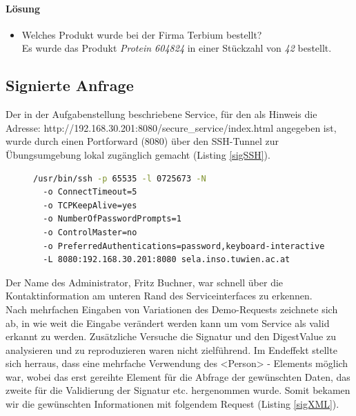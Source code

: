 \documentclass[12pt]{article}
\begin{document}
\paragraph{Lösung}
\begin{itemize}
	\item Welches Produkt wurde bei der Firma Terbium bestellt?\\
		Es wurde das Produkt \textit{Protein 604824} in einer Stückzahl von \textit{42} bestellt.
\end{itemize}

\subsection{Signierte Anfrage}
Der in der Aufgabenstellung beschriebene Service, für den als Hinweis die  Adresse: http://192.168.30.201:8080/secure\_service/index.html angegeben ist, wurde durch einen Portforward (8080) über den SSH-Tunnel zur Übungsumgebung lokal zugänglich gemacht (Listing \ref{sigSSH}).\\
\begin{figure}
\begin{lstlisting}[language=sh,caption={SSH Tunnel für Port forward},label=sigSSH,basicstyle=\footnotesize]
/usr/bin/ssh -p 65535 -l 0725673 -N 
  -o ConnectTimeout=5 
  -o TCPKeepAlive=yes 
  -o NumberOfPasswordPrompts=1 
  -o ControlMaster=no 
  -o PreferredAuthentications=password,keyboard-interactive 
  -L 8080:192.168.30.201:8080 sela.inso.tuwien.ac.at
\end{lstlisting}
\end{figure}
Der Name des Administrator, Fritz Buchner, war schnell über die Kontaktinformation am unteren Rand des Serviceinterfaces zu erkennen.\\
Nach mehrfachen Eingaben von Variationen des Demo-Requests zeichnete sich ab, in wie weit die Eingabe verändert werden kann um vom Service als valid erkannt zu werden. Zusätzliche Versuche die Signatur und den DigestValue zu analysieren und zu reproduzieren waren nicht zielführend. Im Endeffekt stellte sich herraus, dass eine mehrfache Verwendung des <Person> - Elements möglich war, wobei das erst gereihte Element für die Abfrage der gewünschten Daten, das zweite für die Validierung der Signatur etc. hergenommen wurde. Somit bekamen wir die gewünschten Informationen mit folgendem Request (Listing \ref{sigXML}). 
\end{document}

